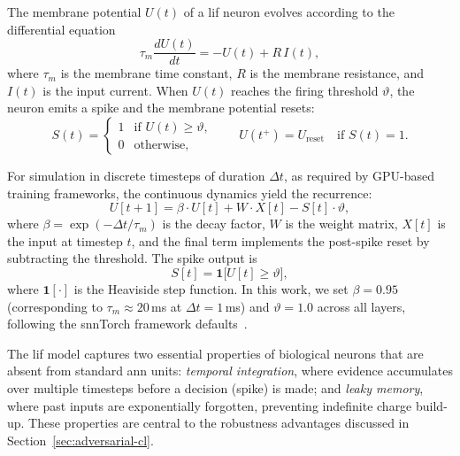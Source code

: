 \begin{definition}
\label{def:lif}
The membrane potential $U(t)$ of a \gls{lif} neuron evolves according to the differential equation
\begin{equation}
    \tau_m \frac{dU(t)}{dt} = -U(t) + R \, I(t),
    \label{eq:lif-continuous}
\end{equation}
where $\tau_m$ is the membrane time constant, $R$ is the membrane resistance, and $I(t)$ is the input current. When $U(t)$ reaches the firing threshold $\vartheta$, the neuron emits a spike and the membrane potential resets:
\begin{equation}
    S(t) = \begin{cases} 1 & \text{if } U(t) \geq \vartheta, \\ 0 & \text{otherwise}, \end{cases}
    \qquad
    U(t^+) = U_{\mathrm{reset}} \quad \text{if } S(t) = 1.
    \label{eq:lif-spike}
\end{equation}
\end{definition}

For simulation in discrete timesteps of duration $\Delta t$, as required by GPU-based training frameworks, the continuous dynamics yield the recurrence:
\begin{equation}
    U[t+1] = \beta \cdot U[t] + W \cdot X[t] - S[t] \cdot \vartheta,
    \label{eq:lif-discrete}
\end{equation}
where $\beta = \exp(-\Delta t / \tau_m)$ is the decay factor, $W$ is the weight matrix, $X[t]$ is the input at timestep $t$, and the final term implements the post-spike reset by subtracting the threshold. The spike output is
\begin{equation}
    S[t] = \mathbf{1}\bigl[U[t] \geq \vartheta\bigr],
    \label{eq:spike-function}
\end{equation}
where $\mathbf{1}[\cdot]$ is the Heaviside step function. In this work, we set $\beta = 0.95$ (corresponding to $\tau_m \approx 20$\,ms at $\Delta t = 1$\,ms) and $\vartheta = 1.0$ across all layers, following the snnTorch framework defaults~\citep{eshraghian2023}.

The \gls{lif} model captures two essential properties of biological neurons that are absent from standard \gls{ann} units: \emph{temporal integration}, where evidence accumulates over multiple timesteps before a decision (spike) is made; and \emph{leaky memory}, where past inputs are exponentially forgotten, preventing indefinite charge build-up. These properties are central to the robustness advantages discussed in Section~\ref{sec:adversarial-cl}.

